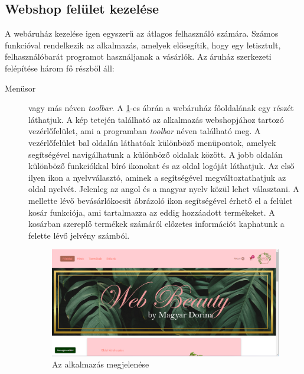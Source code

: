 \subsection{Webshop felület kezelése}
A webáruház kezelése igen egyszerű az átlagos felhasználó számára. Számos funkcióval rendelkezik az alkalmazás, amelyek elősegítik, hogy egy letisztult, felhasználóbarát programot használjanak a vásárlók.
Az áruház szerkezeti felépítése három fő részből áll:
\begin{description}
	\item[Menüsor] vagy más néven \textit{toolbar}. A \ref{fig.exemple-2}-es ábrán a webáruház főoldalának egy részét láthatjuk. A kép tetején található az alkalmazás webshopjához tartozó vezérlőfelület, ami a programban \textit{toolbar} néven található meg. A vezérlőfelület bal oldalán láthatóak különböző menüpontok, amelyek segítségével navigálhatunk a különböző oldalak között. A jobb oldalán különböző funkciókkal bíró ikonokat és az oldal logóját láthatjuk. Az első ilyen ikon a nyelvválasztó, aminek a segítségével megváltoztathatjuk az oldal nyelvét. Jelenleg az angol és a magyar nyelv közül lehet választani. A mellette lévő bevásárlókocsit ábrázoló ikon segítségével érhető el a felület kosár funkciója, ami tartalmazza az eddig hozzáadott termékeket. A kosárban szereplő termékek számáról előzetes információt kaphatunk a felette lévő jelvény számból.
	
	\begin{figure}[H]
		\centering
		\includegraphics[width=1.0\textwidth]{images/webshop_home.png}
		\caption{Az alkalmazás megjelenése}
		\label{fig.exemple-2}
	\end{figure}
	

\end{description}
